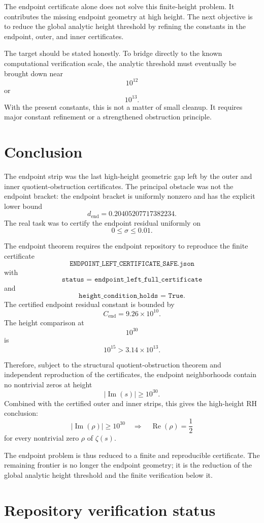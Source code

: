 \documentclass[11pt]{article}
\DeclareMathOperator{\Rea}{Re}
\DeclareMathOperator{\Ima}{Im}
\newcommand{\Cend}{C_{\mathrm{end}}}
\newcommand{\dend}{d_{\mathrm{end}}}
\begin{document}
The endpoint certificate alone does not solve this finite-height problem.  It contributes the missing endpoint geometry at high height.  The next objective is to reduce the global analytic height threshold by refining the constants in the endpoint, outer, and inner certificates.

The target should be stated honestly.  To bridge directly to the known computational verification scale, the analytic threshold must eventually be brought down near
\[
10^{12}
\]
or
\[
10^{13}.
\]
With the present constants, this is not a matter of small cleanup.  It requires major constant refinement or a strengthened obstruction principle.

\section{Conclusion}

The endpoint strip was the last high-height geometric gap left by the outer and inner quotient-obstruction certificates.  The principal obstacle was not the endpoint bracket: the endpoint bracket is uniformly nonzero and has the explicit lower bound
\[
\dend=0.20405207717382234.
\]
The real task was to certify the endpoint residual uniformly on
\[
0\leq\sigma\leq0.01.
\]

The endpoint theorem requires the endpoint repository to reproduce the finite certificate
\[
\texttt{ENDPOINT\_LEFT\_CERTIFICATE\_SAFE.json}
\]
with
\[
\texttt{status = endpoint\_left\_full\_certificate}
\]
and
\[
\texttt{height\_condition\_holds = True}.
\]
The certified endpoint residual constant is bounded by
\[
\Cend
=
9.26\times10^{10}.
\]
The height comparison at
\[
10^{30}
\]
is
\[
10^{15}
>
3.14\times10^{13}.
\]

Therefore, subject to the structural quotient-obstruction theorem and independent reproduction of the certificates, the endpoint neighborhoods contain no nontrivial zeros at height
\[
|\Ima(s)|\geq10^{30}.
\]
Combined with the certified outer and inner strips, this gives the high-height RH conclusion:
\[
|\Ima(\rho)|\geq10^{30}
\quad
\Longrightarrow
\quad
\Rea(\rho)=\frac12
\]
for every nontrivial zero \(\rho\) of \(\zeta(s)\).

The endpoint problem is thus reduced to a finite and reproducible certificate.  The remaining frontier is no longer the endpoint geometry; it is the reduction of the global analytic height threshold and the finite verification below it.

\section*{Repository verification status}
\end{document}

